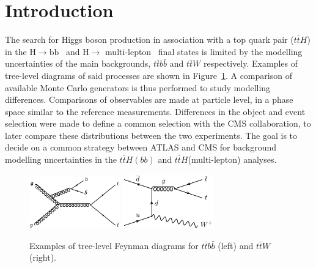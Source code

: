 \section{Introduction}
\label{sec:intro}
The search for Higgs boson production in association with a top quark pair ($t\bar{t}H$) in the $\mathrm{H\rightarrow bb}$~\cite{HIGG-2017-03} and $\mathrm{H\rightarrow}$ multi-lepton~\cite{ATLAS-CONF-2019-045} final states is limited by the modelling uncertainties of the main backgrounds, $t\bar{t}b\bar{b}$ and $t\bar{t}W$ respectively. %
Examples of tree-level diagrams of said processes are shown in Figure~\ref{intro:sig}. A comparison of available Monte Carlo generators is thus performed to study modelling differences. Comparisons of observables are made at particle level, in a phase space similar to the reference measurements. Differences in the object and event selection were made to define a common selection with the CMS collaboration, to later compare these distributions between the two experiments. The goal is to decide on a common strategy between ATLAS and CMS for background modelling uncertainties in the $t\bar{t}H(bb)$ and $t\bar{t}H$(multi-lepton) analyses.

\begin{figure}[!htb]
\centering
\includegraphics[width=0.35\textwidth]{Plots/ttbb/ttbb}
\includegraphics[width=0.35\textwidth]{Plots/ttV/ttW}
  \caption{Examples of tree-level Feynman diagrams for $t\bar{t}b\bar{b}$ (left) and $t\bar{t}W$ (right). \label{intro:sig}}
\end{figure}
